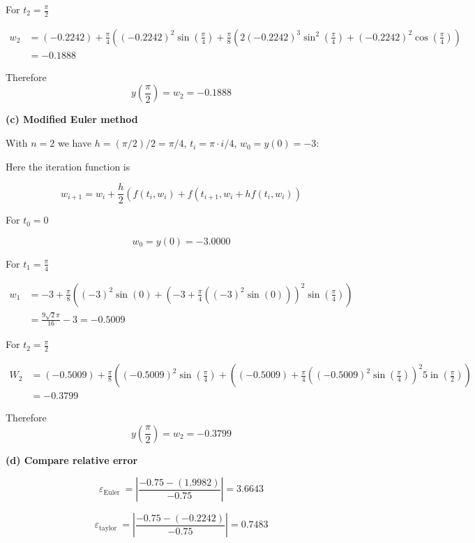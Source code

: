 \begin{solution}
For $t_2=\frac{\pi}{2}$


$$
\begin{aligned}
w_{2} &=(-0.2242)+\frac{\pi}{4}\left((-0.2242)^{2} \sin \left(\frac{\pi}{4}\right)+\frac{\pi}{8}\left(2(-0.2242)^{3} \sin ^{2}\left(\frac{\pi}{4}\right)+(-0.2242)^{2} \cos \left(\frac{\pi}{4}\right)\right)\right.\\
&=-0.1888
\end{aligned}
$$


Therefore 
$$
y(\frac{\pi}{2})=w_2=-0.1888
$$
\dotfill


\textbf{(c) Modified Euler method}



With $n=2$ we have $h=(\pi/2)/2=\pi/4$, $t_i=\pi \cdot i /4$, $w_0=y(0)=-3$:



Here the iteration function is

$$
w_{i+1}=w_{i}+\frac{h}{2}\left(f\left(t_{i}, w_{i}\right)+f\left(t_{i+1}, w_{i}+h f\left(t_{i}, w_{i}\right)\right)\right.
$$


For $t_0=0$

$$
w_0=y(0)=-3.0000
$$

For $t_1=\frac{\pi}{4}$


$$
\begin{aligned}
w_{1} &=-3+\frac{\pi}{8}\left((-3)^{2} \sin (0)+\left(-3+\frac{\pi}{4}\left((-3)^{2} \sin (0)\right)\right)^{2} \sin \left(\frac{\pi}{4}\right)\right) \\
&=\frac{9 \sqrt{2} \pi}{16}-3=-0.5009
\end{aligned}
$$


For $t_2=\frac{\pi}{2}$


$$
\begin{aligned}
W_{2} &=(-0.5009)+\frac{\pi}{8}\left((-0.5009)^{2} \sin \left(\frac{\pi}{4}\right)+\left((-0.5009)+\frac{\pi}{4}\left((-0.5009)^{2} \sin \left(\frac{\pi}{4}\right)\right)^{2} 5 \operatorname{in}\left(\frac{\pi}{2}\right)\right)\right.\\
&=-0.3799
\end{aligned}
$$




Therefore 
$$
y(\frac{\pi}{2})=w_2=-0.3799
$$


\dotfill


\textbf{(d) Compare relative error}

$$
\varepsilon_{\text {Euler }}=\left|\frac{-0.75-(1.9982)}{-0.75}\right|=3.6643
$$


$$
\varepsilon_{\text {taylor }}=\left|\frac{-0.75-(-0.2242)}{-0.75}\right|=0.7483
$$



\end{solution}

